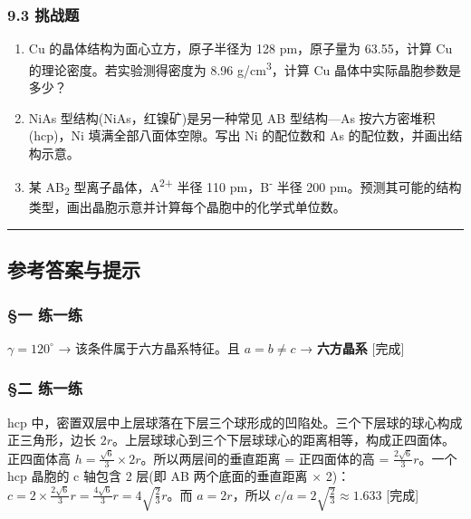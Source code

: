 \subsubsection{9.3 挑战题}\label{ux6311ux6218ux9898}

\begin{enumerate}
\def\labelenumi{\arabic{enumi}.}
\setcounter{enumi}{12}
\tightlist
\item
  Cu 的晶体结构为面心立方，原子半径为 128 pm，原子量为 63.55，计算 Cu 的理论密度。若实验测得密度为 8.96 g/cm\textsuperscript{3}，计算 Cu 晶体中实际晶胞参数是多少？
\item
  NiAs 型结构(NiAs，红镍矿)是另一种常见 AB 型结构---As 按六方密堆积(hcp)，Ni 填满全部八面体空隙。写出 Ni 的配位数和 As 的配位数，并画出结构示意。
\item
  某 AB\textsubscript{2} 型离子晶体，A\textsuperscript{2+} 半径 110 pm，B\textsuperscript{-} 半径 200 pm。预测其可能的结构类型，画出晶胞示意并计算每个晶胞中的化学式单位数。
\end{enumerate}

\begin{center}\rule{0.5\linewidth}{0.5pt}\end{center}

\subsection{参考答案与提示}\label{ux53c2ux8003ux7b54ux6848ux4e0eux63d0ux793a}

\subsubsection{§一 练一练}\label{ux4e00-ux7ec3ux4e00ux7ec3}

\(\gamma = 120^\circ\) → 该条件属于六方晶系特征。且 \(a = b \neq c\) → \textbf{六方晶系} {[}完成{]}

\subsubsection{§二 练一练}\label{ux4e8c-ux7ec3ux4e00ux7ec3}

hcp 中，密置双层中上层球落在下层三个球形成的凹陷处。三个下层球的球心构成正三角形，边长 \(2r\)。上层球球心到三个下层球球心的距离相等，构成正四面体。正四面体高 \(h = \frac{\sqrt{6}}{3} \times 2r\)。所以两层间的垂直距离 = 正四面体的高 = \(\frac{2\sqrt{6}}{3}r\)。一个 hcp 晶胞的 c 轴包含 2 层(即 AB 两个底面的垂直距离 × 2)：\(c = 2 \times \frac{2\sqrt{6}}{3}r = \frac{4\sqrt{6}}{3}r = 4\sqrt{\frac{2}{3}}r\)。而 \(a = 2r\)，所以 \(c/a = 2\sqrt{\frac{2}{3}} \approx 1.633\) {[}完成{]}

